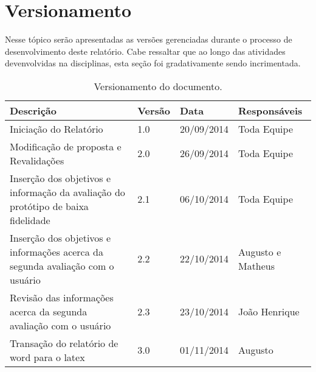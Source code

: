 \chapter[Versionamento]{Versionamento}
\label{chap:versionamento}
	Nesse tópico serão apresentadas as versões gerenciadas durante o processo de desenvolvimento deste relatório. Cabe ressaltar que ao longo das atividades devenvolvidas na disciplinas, esta seção foi gradativamente sendo incrimentada.
	
	\label{subsubsec:versionamento_talbe}
		\begin{table}[h]
			\centering
			\begin{tabular}{|p{5cm}|p{1.5cm}|p{2.5cm}|p{5cm}|}
				\hline
				
				Descrição & Versão & Data & Responsáveis \\ \hline
				
				Iniciação do Relatório & 1.0 & 20/09/2014 & Toda Equipe \\ \hline
				
				Modificação de proposta e Revalidações & 2.0 & 26/09/2014 & Toda Equipe \\ \hline
				
				Inserção dos objetivos e informação da avaliação do protótipo de baixa fidelidade & 2.1 & 06/10/2014 & Toda Equipe \\ \hline

				Inserção dos objetivos e informações acerca da segunda avaliação com o usuário & 2.2 & 22/10/2014 & Augusto e Matheus \\ \hline

				Revisão das informações acerca da segunda avaliação com o usuário & 2.3 & 23/10/2014 & João Henrique \\ \hline

				Transação do relatório de word para o latex & 3.0 & 01/11/2014 & Augusto \\ \hline



			\end{tabular}
			\caption[Versionamento do Documento]{Versionamento do documento.}
			\label{tab:versionamento_tabl}
		\end{table}
